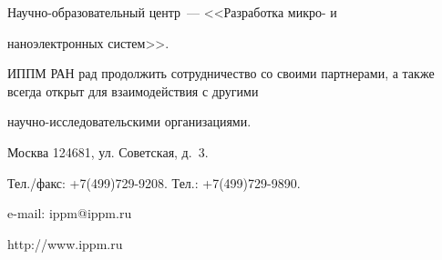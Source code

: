 Научно-образовательный центр~--- <<Разработка микро- и 


наноэлектронных систем>>.





\bigskip





ИППМ РАН рад продолжить сотрудничество со своими партнерами, а также всегда открыт для взаимодействия с другими 


научно-исследовательскими организациями.





\begin{center}


Москва 124681, ул. Советская, д.\ 3.





Тел./факс: +7(499)729-9208. Тел.: +7(499)729-9890.





e-mail: ippm@ippm.ru





{\sf http://www.ippm.ru}


\end{center}


